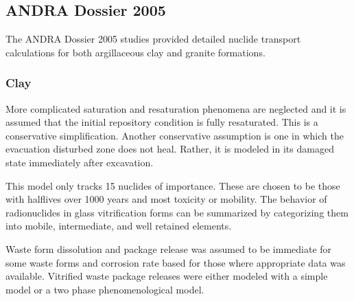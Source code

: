 \subsection{ANDRA Dossier 2005}
The ANDRA Dossier 2005 studies provided detailed nuclide transport 
calculations for both argillaceous clay and granite formations.

\subsubsection{Clay}
More complicated saturation and resaturation phenomena are neglected 
and it is assumed that the initial repository condition is fully 
resaturated. This is a conservative simplification. Another 
conservative assumption is one in which the evacuation disturbed zone 
does not heal. Rather, it is modeled in its damaged state immediately 
after excavation. 

This model only tracks 15 nuclides of importance.  
These are chosen to be those with halflives over 1000 years and most 
toxicity or mobility. \cite{andra_argile:_2005} %
The behavior of radionuclides in glass vitrification forms can be 
summarized by categorizing them into mobile, intermediate, and well 
retained elements. %






Waste form dissolution and package release was assumed to be 
immediate for some waste forms and corrosion rate based for those 
where appropriate data was available. Vitrified waste package releases 
were either modeled with a simple model or a two phase 
phenomenological model. %


